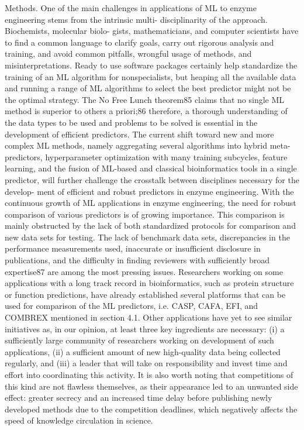 \documentclass[12pt]{article}
\begin{document}
Methods. One of the main challenges in applications of ML
to enzyme engineering stems from the intrinsic multi-
disciplinarity of the approach. Biochemists, molecular biolo-
gists, mathematicians, and computer scientists have to ﬁnd a
common language to clarify goals, carry out rigorous analysis
and training, and avoid common pitfalls, wrongful usage of
methods, and misinterpretations. Ready to use software
packages certainly help standardize the training of an ML
algorithm for nonspecialists, but heaping all the available data
and running a range of ML algorithms to select the best
predictor might not be the optimal strategy. The No Free
Lunch theorem85 claims that no single ML method is superior
to others a priori;86 therefore, a thorough understanding of the
data types to be used and problems to be solved is essential in
the development of eﬃcient predictors. The current shift
toward new and more complex ML methods, namely
aggregating several algorithms into hybrid meta-predictors,
hyperparameter optimization with many training subcycles,
feature learning, and the fusion of ML-based and classical
bioinformatics tools in a single predictor, will further challenge
the crosstalk between disciplines necessary for the develop-
ment of eﬃcient and robust predictors in enzyme engineering.
With the continuous growth of ML applications in enzyme
engineering, the need for robust comparison of various
predictors is of growing importance. This comparison is
mainly obstructed by the lack of both standardized protocols
for comparison and new data sets for testing. The lack of
benchmark data sets, discrepancies in the performance
measurements used, inaccurate or insuﬃcient disclosure in
publications, and the diﬃculty in ﬁnding reviewers with
suﬃciently broad expertise87 are among the most pressing
issues. Researchers working on some applications with a long
track record in bioinformatics, such as protein structure or
function predictions, have already established several platforms
that can be used for comparison of the ML predictors, i.e.
CASP, CAFA, EFI, and COMBREX mentioned in section 4.1.
Other applications have yet to see similar initiatives as, in our
opinion, at least three key ingredients are necessary: (i) a
suﬃciently large community of researchers working on
development of such applications, (ii) a suﬃcient amount of
new high-quality data being collected regularly, and (iii) a
leader that will take on responsibility and invest time and eﬀort
into coordinating this activity. It is also worth noting that
competitions of this kind are not ﬂawless themselves, as their
appearance led to an unwanted side eﬀect: greater secrecy and
an increased time delay before publishing newly developed
methods due to the competition deadlines, which negatively
aﬀects the speed of knowledge circulation in science.
\end{document}
